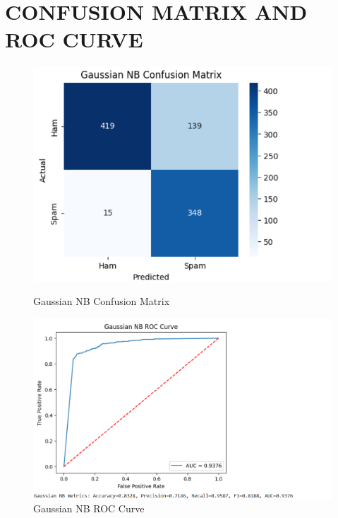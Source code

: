 \documentclass[12pt]{article}
\begin{document}
\section*{CONFUSION MATRIX AND ROC CURVE}

\begin{figure}[H]
\centering
\begin{minipage}{0.45\textwidth}
\centering
\includegraphics[width=\linewidth]{6.png}
\caption{Gaussian NB Confusion Matrix}
\end{minipage}
\hfill
\begin{minipage}{0.45\textwidth}
\centering
\includegraphics[width=\linewidth]{7.png}
\caption{Gaussian NB ROC Curve}
\end{minipage}
\end{figure}
\end{document}
